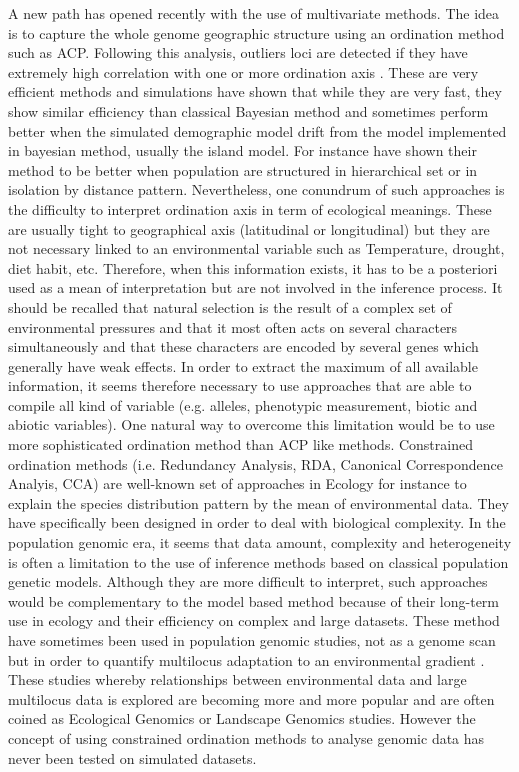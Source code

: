 \documentclass[nogrid]{MBE}%
\begin{document}
	A new path has opened recently with the use of multivariate methods. The idea is to capture the whole genome geographic structure using an ordination method such as ACP. Following this analysis, outliers loci are detected if they have extremely high correlation with one or more ordination axis \citep{Duforet-Frebourg2014a,Luu2016}.  These are very efficient methods and simulations have shown that while they are very fast, they show similar efficiency than classical Bayesian method and sometimes perform better when the simulated demographic model drift from the model implemented in bayesian method, usually the island model. For instance \citet{Luu2016} have shown their method to be better when population are structured in hierarchical set or in isolation by distance pattern. Nevertheless, one conundrum of such approaches is the difficulty to interpret ordination axis in term of ecological meanings. These are usually tight to geographical axis (latitudinal or longitudinal) but they are not necessary linked to an environmental variable such as Temperature, drought, diet habit, etc. Therefore, when this information exists, it has to be a posteriori used as a mean of interpretation but are not involved in the inference process.
	It should be recalled that natural selection is the result of a complex set of environmental pressures and that it most often acts on several characters simultaneously and that these characters are encoded by several genes which generally have weak effects. In order to extract the maximum of all available information, it seems therefore necessary to use approaches that are able to compile all kind of variable (e.g. alleles, phenotypic measurement, biotic and abiotic variables).
	One natural way to overcome this limitation would be to use more sophisticated ordination method than ACP like methods. Constrained ordination methods (i.e. Redundancy Analysis, RDA, Canonical Correspondence Analyis, CCA) are well-known set of approaches in Ecology for instance to explain the species distribution pattern by the mean of environmental data. They have specifically been designed in order to deal with biological complexity. In the population genomic era, it seems that data amount, complexity and heterogeneity is often a limitation to the use of inference methods based on classical population genetic models. Although they are more difficult to interpret, such approaches would be complementary to the model based method because of their long-term use in ecology and their efficiency on complex and large datasets. These method have sometimes been used in population genomic studies, not as a genome scan but in order to quantify multilocus adaptation to an environmental gradient \citep{Lasky2012,DeKort2014,Steane2014a,Hecht2015}. These studies whereby relationships between environmental data and large multilocus data is explored are becoming more and more popular and are often coined as Ecological Genomics or Landscape Genomics studies. However the concept of using constrained ordination methods to analyse genomic data has never been tested on simulated datasets.
\end{document}
